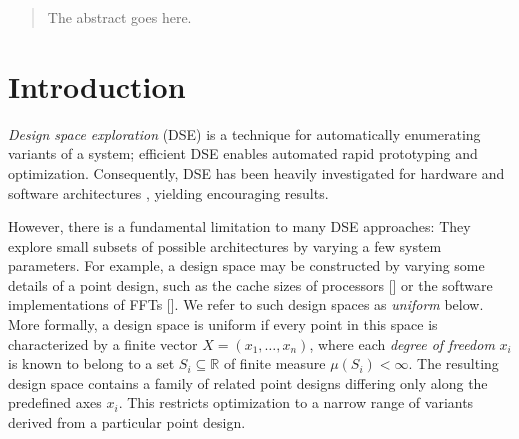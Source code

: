 \documentclass[conference]{IEEEtran}
\begin{document}
\begin{abstract}
The abstract goes here.
\end{abstract}





%
\IEEEpeerreviewmaketitle

\section{Introduction}
\textit{Design space exploration} (DSE) is a technique for automatically enumerating variants of a system; efficient DSE enables automated rapid prototyping and optimization. Consequently, DSE has been heavily investigated for hardware \cite{Mariani2010,Ascia2007,Kakita2006} and software architectures \cite{}, yielding encouraging results. 

However, there is a fundamental limitation to many DSE approaches: They explore small subsets of possible architectures by varying a few system parameters. For example, a design space may be constructed by varying some details of a point design, such as the cache sizes of processors [] or the software implementations of FFTs []. We refer to such design spaces as \emph{uniform} below. More formally, a design space is uniform if every point in this space is characterized by a finite vector $X = \left(x_1, \ldots, x_n\right)$, where each \emph{degree of freedom} $x_i$ is known to belong to a set $S_i \subseteq \mathbb{R}$ of finite measure $\mu(S_i) < \infty$. The resulting design space contains a family of related point designs differing only along the predefined axes $x_i$. This restricts optimization to a narrow range of variants derived from a particular point design. 
\end{document}
